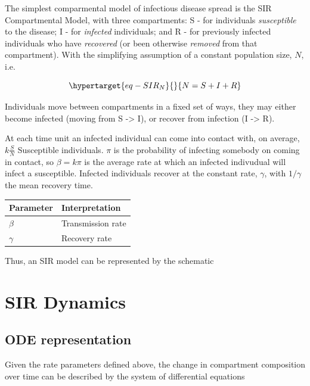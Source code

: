 \documentclass{monashthesis}
\begin{document}
The simplest comparmental model of infectious disease spread is the SIR
Compartmental Model, with three compartments: S - for individuals
\emph{susceptible} to the disease; I - for \emph{infected} individuals;
and R - for previously infected individuals who have \emph{recovered}
(or been otherwise \emph{removed} from that compartment). With the
simplifying assumption of a constant population size, \(N\), i.e.

\begin{equation}\protect\hypertarget{eq-SIR_N}{}{
N = S + I + R
}\label{eq-SIR_N}\end{equation}

Individuals move between compartments in a fixed set of ways, they may
either become infected (moving from S -\textgreater{} I), or recover
from infection (I -\textgreater{} R).

At each time unit an infected individual can come into contact with, on
average, \(k\frac{S}{N}\) Susceptible individuals. \(\pi\) is the
probability of infecting somebody on coming in contact, so
\(\beta = k\pi\) is the average rate at which an infected indivudual
will infect a susceptible. Infected individuals recover at the constant
rate, \(\gamma\), with \(1/\gamma\) the mean recovery time.

\begin{longtable}[]{@{}ll@{}}
\toprule\noalign{}
Parameter & Interpretation \\
\midrule\noalign{}
\endhead
\bottomrule\noalign{}
\endlastfoot
\(\beta\) & Transmission rate \\
\(\gamma\) & Recovery rate \\
\end{longtable}

Thus, an SIR model can be represented by the schematic

\hypertarget{sir-dynamics}{%
\section{SIR Dynamics}\label{sir-dynamics}}

\hypertarget{ode-representation}{%
\subsection{ODE representation}\label{ode-representation}}

Given the rate parameters defined above, the change in compartment
composition over time can be described by the system of differential
equations
\end{document}

